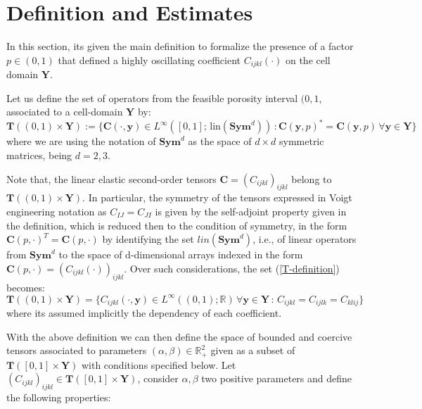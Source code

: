 \section{Definition and Estimates}
In this section, its given the main definition to formalize the presence of a factor $p \in (0,1)$ that defined a highly oscillating coefficient $C_{ijkl}(\cdot)$ on the cell domain $\mathbf{Y}$.
\begin{defn}
Let us define the set of operators from the feasible porosity interval $(0,1$, associated to a cell-domain $\mathbf{Y}$ by:
\begin{equation}
    \label{T-definition}
    \mathbf{T}((0,1) \times \mathbf{Y}) := \big \{ \mathbf{C}(\cdot, \mathbf{y}) \in L^{\infty}([0,1]; \, \text{lin}(\textbf{Sym}^d))\, : \mathbf{C}(\mathbf{y}, p)^* = \mathbf{C}(\mathbf{y}, p) \, \forall \mathbf{y} \in \mathbf{Y}\big \}
\end{equation}
where we are using the notation of $\mathbf{Sym}^d$ as the space of $d\times d$ symmetric matrices, being $d=2,3$.
\end{defn}
\begin{rem}
Note that, the linear elastic second-order tensors $\mathbf{C} = (C_{ijkl})_{ijkl}$ belong to $\mathbf{T}((0,1)\times \mathbf{Y})$. In particular, the symmetry of the tensors expressed in Voigt engineering notation as $C_{IJ}=C_{JI}$ is given by the self-adjoint property given in the definition, which is reduced then to the condition of symmetry, in the form $\mathbf{C}(p, \cdot)^T = \mathbf{C}(p,\cdot)$ by identifying the set $lin(\mathbf{Sym}^d)$, i.e., of linear operators from $\mathbf{Sym}^d$ to the space of d-dimensional arrays indexed in the form $\mathbf{C}(p, \cdot) = (C_{ijkl} (\cdot) )_{ijkl}$.
Over such considerations, the set (\ref{T-definition}) becomes:
\begin{equation*}
    \mathbf{T}((0,1)\times \mathbf{Y}) = \big \{ C_{ijkl}(\cdot, \mathbf{y}) \in L^{\infty}((0,1); \mathbb{R}) \, \forall \mathbf{y} \in \mathbf{Y}\,:\, C_{ijkl} = C_{ijlk} = C_{klij} \big \}
\end{equation*}
where its assumed implicitly the dependency of each coefficient.
\end{rem}
With the above definition we can then define the space of bounded and coercive tensors associated to parameters $(\alpha,\beta) \in \mathbb{R}^2_+$ given as a subset of $\mathbf{T}([0,1]\times \mathbf{Y})$ with conditions specified below.
Let $(C_{ijkl})_{ijkl} \in \mathbf{T}([0,1]\times \mathbf{Y})$, consider $\alpha, \beta$ two positive parameters and define the following properties:
